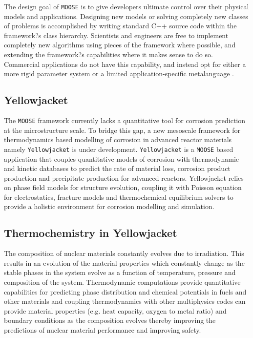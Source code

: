     The design goal of \texttt{MOOSE} is to give developers ultimate control over their physical models and applications. Designing new models or solving completely new classes of problems is accomplished by writing standard C++ source code within the framework?s class hierarchy. Scientists and engineers are free to implement completely new algorithms using pieces of the framework where possible, and extending the framework?s capabilities where it makes sense to do so. Commercial applications do not have this capability, and instead opt for either a more rigid parameter system or a limited application-specific metalanguage \cite{moose-web-page}.
    
    \subsection*{Yellowjacket}
    The \texttt{MOOSE} framework currently lacks a quantitative tool for corrosion prediction at the microstructure scale. To bridge this gap, a new mesoscale framework for thermodynamics based modelling of corrosion in advanced reactor materials namely \texttt{Yellowjacket} is under development. \texttt{Yellowjacket} is a \texttt{MOOSE} based application that couples quantitative models of corrosion with thermodynamic and kinetic databases to predict the rate of material loss, corrosion product production and precipitate production for advanced reactors. Yellowjacket relies on phase field models for structure evolution, coupling it with Poisson equation for electrostatics, fracture models and thermochemical equilibrium solvers to provide a holistic  environment for corrosion modelling and simulation.
    
    \subsection*{Thermochemistry in Yellowjacket}
    The composition of nuclear materials constantly evolves due to irradiation. This results in an evolution of the material properties which constantly change as the stable phases in the system evolve as a function of temperature, pressure and composition of the system. Thermodynamic computations provide quantitative capabilities for predicting phase distribution and chemical potentials in fuels and other materials and coupling thermodynamics with other multiphysics codes can provide material properties (e.g. heat capacity, oxygen to metal ratio) and boundary conditions as the composition evolves thereby improving the predictions of nuclear material performance and improving safety.
    
